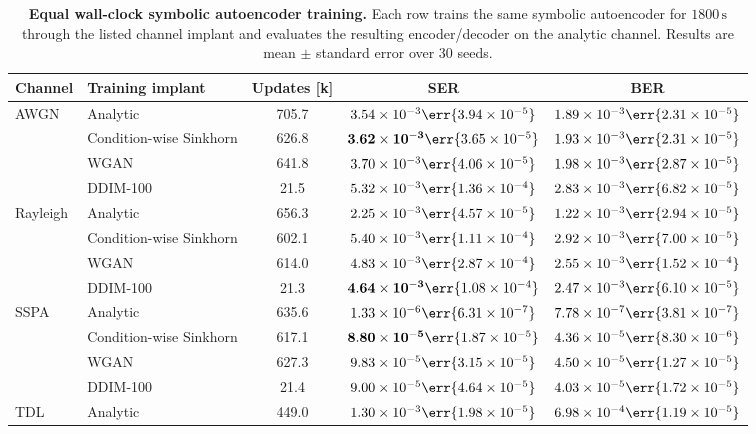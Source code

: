 \begin{table}[t]
\centering
\caption{\textbf{Equal wall-clock symbolic autoencoder training.} Each row trains the same symbolic autoencoder for \(1800\,\mathrm{s}\) through the listed channel implant and evaluates the resulting encoder/decoder on the analytic channel. Results are mean \(\pm\) standard error over 30 seeds.}
\label{tab:equal-wallclock-symbolic}
\tablefontsize
\begin{tabular}{@{}llccc@{}}
\toprule
Channel & Training implant & Updates [k] & SER & BER \\
\midrule
AWGN & Analytic & 705.7 & $3.54\times 10^{-3}\err{3.94\times 10^{-5}}$ & $1.89\times 10^{-3}\err{2.31\times 10^{-5}}$ \\
& Condition-wise Sinkhorn & 626.8 & $\mathbf{3.62\times 10^{-3}}\err{3.65\times 10^{-5}}$ & $1.93\times 10^{-3}\err{2.31\times 10^{-5}}$ \\
& WGAN & 641.8 & $3.70\times 10^{-3}\err{4.06\times 10^{-5}}$ & $1.98\times 10^{-3}\err{2.87\times 10^{-5}}$ \\
& DDIM-100 & 21.5 & $5.32\times 10^{-3}\err{1.36\times 10^{-4}}$ & $2.83\times 10^{-3}\err{6.82\times 10^{-5}}$ \\
\midrule
Rayleigh & Analytic & 656.3 & $2.25\times 10^{-3}\err{4.57\times 10^{-5}}$ & $1.22\times 10^{-3}\err{2.94\times 10^{-5}}$ \\
& Condition-wise Sinkhorn & 602.1 & $5.40\times 10^{-3}\err{1.11\times 10^{-4}}$ & $2.92\times 10^{-3}\err{7.00\times 10^{-5}}$ \\
& WGAN & 614.0 & $4.83\times 10^{-3}\err{2.87\times 10^{-4}}$ & $2.55\times 10^{-3}\err{1.52\times 10^{-4}}$ \\
& DDIM-100 & 21.3 & $\mathbf{4.64\times 10^{-3}}\err{1.08\times 10^{-4}}$ & $2.47\times 10^{-3}\err{6.10\times 10^{-5}}$ \\
\midrule
SSPA & Analytic & 635.6 & $1.33\times 10^{-6}\err{6.31\times 10^{-7}}$ & $7.78\times 10^{-7}\err{3.81\times 10^{-7}}$ \\
& Condition-wise Sinkhorn & 617.1 & $\mathbf{8.80\times 10^{-5}}\err{1.87\times 10^{-5}}$ & $4.36\times 10^{-5}\err{8.30\times 10^{-6}}$ \\
& WGAN & 627.3 & $9.83\times 10^{-5}\err{3.15\times 10^{-5}}$ & $4.50\times 10^{-5}\err{1.27\times 10^{-5}}$ \\
& DDIM-100 & 21.4 & $9.00\times 10^{-5}\err{4.64\times 10^{-5}}$ & $4.03\times 10^{-5}\err{1.72\times 10^{-5}}$ \\
\midrule
TDL & Analytic & 449.0 & $1.30\times 10^{-3}\err{1.98\times 10^{-5}}$ & $6.98\times 10^{-4}\err{1.19\times 10^{-5}}$ \\

\end{tabular}
\end{table}

